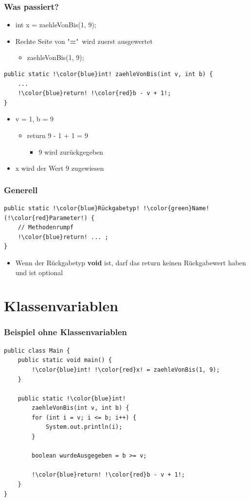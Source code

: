 \documentclass[final]{beamer}
\begin{document}
\begin{frame}[containsverbatim]
	\frametitle{Was passiert?}
	\begin{itemize}
		\item{{\color{blue}int} {\color{red}x} = zaehleVonBis(1, 9);}
		\item{Rechte Seite von "\textbf{=}"\ wird zuerst ausgewertet
			\begin{itemize}
				\item{zaehleVonBis(1, 9);}
			\end{itemize}
		}
	\end{itemize}
	\begin{lstlisting}[escapechar=!]
public static !\color{blue}int! zaehleVonBis(int v, int b) {
	...
	!\color{blue}return! !\color{red}b - v + 1!;
}\end{lstlisting}
	\begin{itemize}
		\item{v = 1, b = 9
			\begin{itemize}
				\item{return 9 - 1 + 1 = 9}
					\begin{itemize}
						\item{9 wird zurückgegeben}
					\end{itemize}
			\end{itemize}
		}
		\item{{\color{red}x} wird der Wert 9 zugewiesen}
	\end{itemize}
\end{frame}

\begin{frame}[containsverbatim]
	\frametitle{Generell}
	\begin{lstlisting}[escapechar=!]
public static !\color{blue}Rückgabetyp! !\color{green}Name! (!\color{red}Parameter!) {
	// Methodenrumpf
	!\color{blue}return! ... ; 
}
	\end{lstlisting}
	\begin{itemize}
		\item{Wenn der {\color{blue}Rückgabetyp} \textbf{void} ist, darf das {\color{blue}return} keinen Rückgabewert haben und ist optional}
	\end{itemize}
\end{frame}

\section{Klassenvariablen}
\begin{frame}[containsverbatim]
	\frametitle{Beispiel ohne Klassenvariablen}
	\begin{lstlisting}[escapechar=!]
public class Main {
	public static void main() {
		!\color{blue}int! !\color{red}x! = zaehleVonBis(1, 9);
	}
	
	public static !\color{blue}int! 
		zaehleVonBis(int v, int b) {
		for (int i = v; i <= b; i++) {
			System.out.println(i);
		}
		
		boolean wurdeAusgegeben = b >= v;
		
		!\color{blue}return! !\color{red}b - v + 1!;
	}
}
	\end{lstlisting}
\end{frame}
\end{document}
